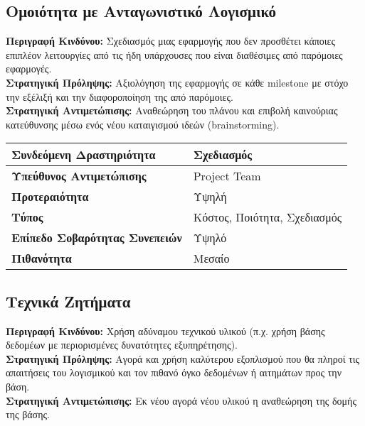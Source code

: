 \documentclass{article}
\newcommand\T{\rule{0pt}{2.6ex}}       %
\newcommand\B{\rule[-1.2ex]{0pt}{0pt}}
\begin{document}
\subsection{Ομοιότητα με Ανταγωνιστικό Λογισμικό}

\textbf{Περιγραφή Κινδύνου:} Σχεδιασμός μιας εφαρμογής που δεν προσθέτει κάποιες επιπλέον
λειτουργίες από τις ήδη υπάρχουσες που είναι διαθέσιμες από παρόμοιες εφαρμογές.\\

\textbf{Στρατηγική Πρόληψης:} Αξιολόγηση της εφαρμογής σε κάθε milestone με στόχο την
εξέλιξή και την διαφοροποίηση της από παρόμοιες.\\


\textbf{Στρατηγική Αντιμετώπισης:} Αναθεώρηση του πλάνου και επιβολή καινούριας κατεύθυνσης μέσω ενός νέου καταιγισμού ιδεών (brainstorming).\\
 
 \begin{center}
     \begin{tabular}{|l|l|}
     \hline
      \textbf{Συνδεόμενη Δραστηριότητα}   & Σχεδιασμός \T\B \\ 
      \hline
      \textbf{Υπεύθυνος Αντιμετώπισης} & Project Team \T\B \\
      \hline
      \textbf{Προτεραιότητα} & Υψηλή \T\B \\
      \hline
      \textbf{Τύπος} & Κόστος, Ποιότητα, Σχεδιασμός \T\B \\
      \hline
      \textbf{Επίπεδο Σοβαρότητας Συνεπειών} & Υψηλό \T\B \\
      \hline
      \textbf{Πιθανότητα} & Μεσαίο \T\B \\
      \hline
     \end{tabular}
 \end{center}

\subsection{Τεχνικά Ζητήματα}

\textbf{Περιγραφή Κινδύνου:} Χρήση αδύναμου τεχνικού υλικού
(π.χ. χρήση βάσης δεδομέων με περιορισμένες δυνατότητες εξυπηρέτησης).\\

\textbf{Στρατηγική Πρόληψης:} Αγορά και χρήση καλύτερου εξοπλισμού που θα πληροί τις
απαιτήσεις του λογισμικού και τον πιθανό όγκο δεδομένων ή αιτημάτων προς την βάση.\\

\textbf{Στρατηγική Αντιμετώπισης:} Εκ νέου αγορά νέου υλικού η αναθεώρηση της δομής της βάσης.\\
 
\end{document}

